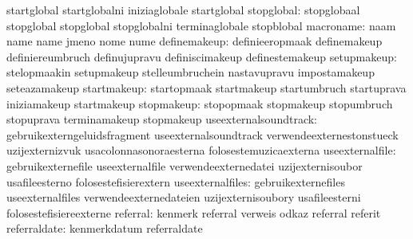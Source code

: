                                   startglobal                      startglobalni
                                  iniziaglobale                    startglobal
                      stopglobal: stopglobaal                      stopglobal
                                  stopglobal                       stopglobalni
                                  terminaglobale                   stopblobal
                       macroname: naam                             name
                                  name                             jmeno
                                  nome                             nume
                    definemakeup: definieeropmaak                  definemakeup
                                  definiereumbruch                 definujupravu
                                  definiscimakeup                  definestemakeup %
                     setupmakeup: stelopmaakin                     setupmakeup
                                  stelleumbruchein                 nastavupravu
                                  impostamakeup                    seteazamakeup
                     startmakeup: startopmaak                      startmakeup
                                  startumbruch                     startuprava
                                  iniziamakeup                     startmakeup
                      stopmakeup: stopopmaak                       stopmakeup
                                  stopumbruch                      stopuprava
                                  terminamakeup                    stopmakeup
           useexternalsoundtrack: gebruikexterngeluidsfragment     useexternalsoundtrack
                                  verwendeexternestonstueck        uzijexternizvuk
                                  usacolonnasonoraesterna          folosestemuzicaexterna
                 useexternalfile: gebruikexternefile               useexternalfile
                                  verwendeexternedatei             uzijexternisoubor
                                  usafileesterno                   folosestefisierextern
                useexternalfiles: gebruikexternefiles              useexternalfiles
                                  verwendeexternedateien           uzijexternisoubory
                                  usafileesterni                   folosestefisiereexterne
                        referral: kenmerk                          referral
                                  verweis                          odkaz
                                  referral                         referit %
                    referraldate: kenmerkdatum                     referraldate
